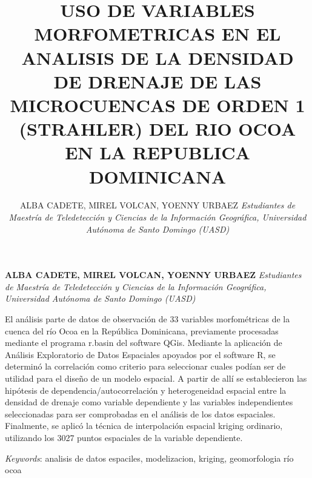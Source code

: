 \documentclass[11pt,]{article}
\title{USO DE VARIABLES MORFOMETRICAS EN EL ANALISIS DE LA DENSIDAD DE DRENAJE
DE LAS MICROCUENCAS DE ORDEN 1 (STRAHLER) DEL RIO OCOA EN LA REPUBLICA
DOMINICANA  }
\author{\Large ALBA CADETE, MIREL VOLCAN, YOENNY URBAEZ\vspace{0.05in} \newline\normalsize\emph{Estudiantes de Maestría de Teledetección y Ciencias de la Información
Geográfica, Universidad Autónoma de Santo Domingo (UASD)}  }
\date{}
\newcommand*{\authorfont}{\fontfamily{phv}\selectfont}
\renewenvironment{abstract}
 {{%
    \setlength{\leftmargin}{0mm}
    \setlength{\rightmargin}{\leftmargin}%
  }%
  \relax}
 {\endlist}
\begin{document}
	
%

{%
\setlength{\parindent}{0pt}
\thispagestyle{plain}
{\fontsize{18}{20}\selectfont\raggedright 
\maketitle  %

}

{
   \vskip 13.5pt\relax \normalsize\fontsize{11}{12} 
\textbf{\authorfont ALBA CADETE, MIREL VOLCAN, YOENNY URBAEZ} \hskip 15pt \emph{\small Estudiantes de Maestría de Teledetección y Ciencias de la Información
Geográfica, Universidad Autónoma de Santo Domingo (UASD)}   

}

}








\begin{abstract}

    \hbox{\vrule height .2pt width 39.14pc}

    \vskip 8.5pt %

\noindent El análisis parte de datos de observación de 33 variables morfométricas
de la cuenca del río Ocoa en la República Dominicana, previamente
procesadas mediante el programa r.basin del software QGis. Mediante la
aplicación de Análisis Exploratorio de Datos Espaciales apoyados por el
software R, se determinó la correlación como criterio para seleccionar
cuales podían ser de utilidad para el diseño de un modelo espacial. A
partir de allí se establecieron las hipótesis de
dependencia/autocorrelación y heterogeneidad espacial entre la densidad
de drenaje como variable dependiente y las variables independientes
seleccionadas para ser comprobadas en el análisis de los datos
espaciales. Finalmente, se aplicó la técnica de interpolación espacial
kriging ordinario, utilizando los 3027 puntos espaciales de la variable
dependiente.


\vskip 8.5pt \noindent \emph{Keywords}: analisis de datos espaciles, modelizacion, kriging, geomorfologia río
ocoa \par

    \hbox{\vrule height .2pt width 39.14pc}



\end{abstract}
\end{document}

